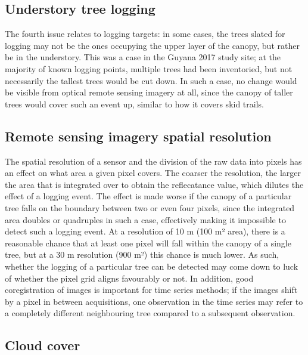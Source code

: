 \documentclass[a4paper,12pt]{scrbook}
\begin{document}
\subsection{Understory tree logging}

The fourth issue relates to logging targets: in some cases, the trees slated for logging may not be the ones occupying the upper layer of the canopy, but rather be in the understory. This was a case in the Guyana 2017 study site; at the majority of known logging points, multiple trees had been inventoried, but not necessarily the tallest trees would be cut down. In such a case, no change would be visible from optical remote sensing imagery at all, since the canopy of taller trees would cover such an event up, similar to how it covers skid trails.

\subsection{Remote sensing imagery spatial resolution}

The spatial resolution of a sensor and the division of the raw data into pixels has an effect on what area a given pixel covers. The coarser the resolution, the larger the area that is integrated over to obtain the reflecatance value, which dilutes the effect of a logging event. The effect is made worse if the canopy of a particular tree falls on the boundary between two or even four pixels, since the integrated area doubles or quadruples in such a case, effectively making it impossible to detect such a logging event. At a resolution of 10 m (100 m² area), there is a reasonable chance that at least one pixel will fall within the canopy of a single tree, but at a 30 m resolution (900 m²) this chance is much lower. As such, whether the logging of a particular tree can be detected may come down to luck of whether the pixel grid aligns favourably or not. In addition, good coregistration of images is important for time series methods; if the images shift by a pixel in between acquisitions, one observation in the time series may refer to a completely different neighbouring tree compared to a subsequent observation.

\subsection{Cloud cover}
\end{document}
